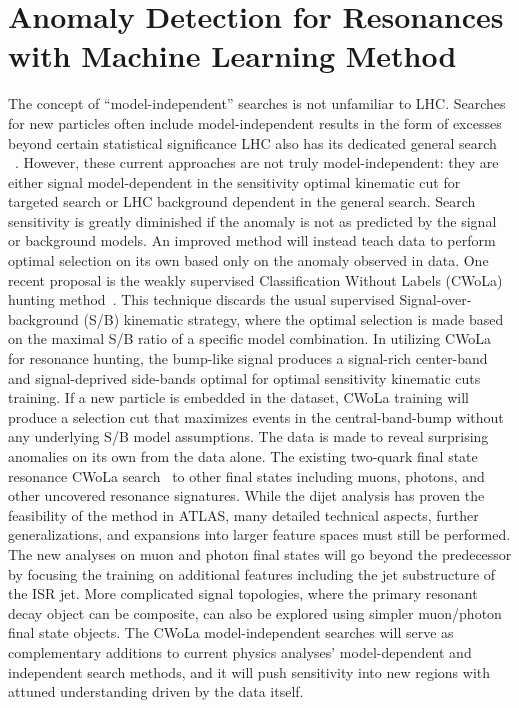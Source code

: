 \section{Anomaly Detection for Resonances with Machine Learning Method}
The concept of “model-independent” searches is not unfamiliar to LHC. Searches for new particles often include model-independent results in the form of excesses beyond certain statistical significance LHC also has its dedicated general search ~\cite{General2019}. However, these current approaches are not truly model-independent: they are either signal model-dependent in the sensitivity optimal kinematic cut for targeted search or LHC background dependent in the general search. Search
sensitivity is greatly diminished if the anomaly is not as predicted by the signal or background models. An improved method will instead teach data to perform optimal selection on its own based only on the anomaly observed in data. One recent proposal is the weakly supervised Classification Without Labels (CWoLa) hunting method~\cite{CWoLA2019}. This technique discards the usual supervised Signal-over-background (S/B) kinematic strategy, where the optimal selection is made based on
the maximal S/B ratio of a specific model combination. In utilizing CWoLa for resonance hunting, the bump-like signal produces a signal-rich center-band and signal-deprived side-bands optimal for optimal sensitivity kinematic cuts training. If a new particle is embedded in the dataset, CWoLa training will produce a selection cut that maximizes events in the central-band-bump without any underlying S/B model assumptions. The data is made to reveal surprising anomalies on its own from the data alone.
The existing two-quark final state resonance CWoLa search~\cite{CWOLA2020} to other final states including muons, photons, and other uncovered resonance signatures. While the dijet analysis has proven the feasibility of the method in ATLAS, many detailed technical aspects, further generalizations, and expansions into larger feature spaces must still be performed. The new analyses on muon and photon final states will go beyond the predecessor by focusing the training on additional features including
the jet substructure of the ISR jet. More complicated signal topologies, where the primary resonant decay object can be composite, can also be explored using simpler muon/photon final state objects. The CWoLa model-independent searches will serve as complementary additions to current physics analyses’ model-dependent and independent search methods, and it will push sensitivity into new regions with attuned understanding driven by the data itself. 

